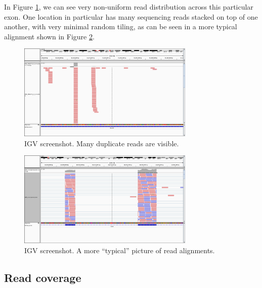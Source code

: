 \documentclass{article}
\begin{document}
{{{{In Figure \ref{fig:igv_dups}, we can see very non-uniform read distribution across this particular exon.  One location in particular has many sequencing reads stacked on top of one another, with very minimal random tiling, as can be seen in a more typical alignment shown in Figure \ref{fig:igv_typical}.

\begin{figure}[ht!]
  \centering
    \includegraphics[width=0.75\textwidth]{igv_duplicates}
    \caption{IGV screenshot.  Many duplicate reads are visible.}
     \label{fig:igv_dups}
\end{figure}

\begin{figure}[ht!]
  \centering
    \includegraphics[width=0.75\textwidth]{igv_typical}
    \caption{IGV screenshot.  A more ``typical'' picture of read alignments.}
     \label{fig:igv_typical}
\end{figure}






\newpage
\appendix

\begin{appendices}



\section{Read coverage}


\end{appendices}}}}}
\end{document}
